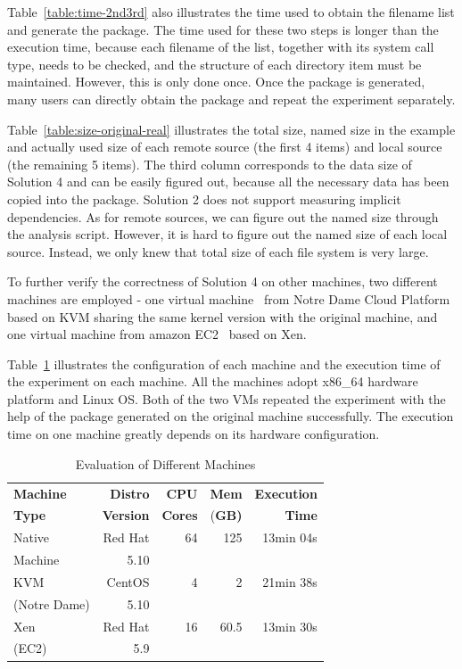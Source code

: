 \documentclass{sig-alternate}
\begin{document}
Table~\ref{table:time-2nd3rd} also illustrates the time used to
obtain the filename list and generate the package. 
The time used for these two steps is longer than the execution time,
because each filename of the list, together with its system call type, needs to be checked, and the structure of each directory item must be maintained.
However, 
this is only done once.
Once the package is
generated, many users can directly obtain the package and repeat the experiment
separately. 

Table~\ref{table:size-original-real} illustrates the total size, named size in the example and actually used size of each remote source (the first 4 items) and local source (the remaining 5 items).
The third column corresponds to the data size of Solution 4 and can be easily figured out, because all the necessary data has been copied into the package.
Solution 2 does not support measuring implicit dependencies. As for remote sources, we can figure out the named size through the analysis script. However, it is hard to figure out the named size of each local source. 
Instead, we only knew that total size of each file system is very large.

To further verify the correctness of Solution 4 on other machines, two different machines are employed -
one virtual
machine~\cite{goldberg1974survey} from Notre Dame Cloud Platform based on KVM sharing the same kernel version with the original machine,
and one virtual machine from amazon EC2~\cite{amazon2010amazon} based on Xen.

Table~\ref{table:config-vm} illustrates the configuration of 
each machine and the execution time of the experiment on each machine.
All the machines adopt x86\_64 hardware platform and Linux OS.
Both of the two VMs repeated the experiment with the help of the package generated on the original machine successfully.
The execution time on one machine greatly depends on its hardware configuration.

\begin{table}
    \centering
    \begin{tabular}{|l|r|r|r|r|}
    \hline
    \bf Machine & \bf Distro & \bf CPU & \bf Mem & \bf Execution\\ 
    \bf Type   &\bf Version&\bf Cores & (\bf GB) & \bf Time\\ \hline
    Native &  Red Hat  & 64 & 125 & 13min 04s\\  
    Machine& 5.10 &&&\\ \hline
    KVM & CentOS & 4 & 2 & 21min 38s\\
    (Notre Dame)&5.10 &&&\\ \hline
    Xen & Red Hat & 16 & 60.5 & 13min 30s\\ 
    (EC2) &5.9 &&&\\ \hline
    \end{tabular}
    \caption{Evaluation of Different Machines}
    \label{table:config-vm}
\end{table}
\end{document}
